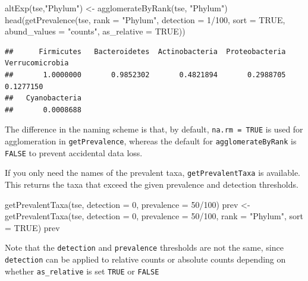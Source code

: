\documentclass[
]{book}
\newenvironment{Shaded}{\begin{snugshade}}{\end{snugshade}}
\newcommand{\AttributeTok}[1]{\textcolor[rgb]{0.77,0.63,0.00}{#1}}
\newcommand{\ConstantTok}[1]{\textcolor[rgb]{0.00,0.00,0.00}{#1}}
\newcommand{\DecValTok}[1]{\textcolor[rgb]{0.00,0.00,0.81}{#1}}
\newcommand{\FunctionTok}[1]{\textcolor[rgb]{0.00,0.00,0.00}{#1}}
\newcommand{\NormalTok}[1]{#1}
\newcommand{\OtherTok}[1]{\textcolor[rgb]{0.56,0.35,0.01}{#1}}
\newcommand{\SpecialCharTok}[1]{\textcolor[rgb]{0.00,0.00,0.00}{#1}}
\newcommand{\StringTok}[1]{\textcolor[rgb]{0.31,0.60,0.02}{#1}}
\begin{document}
\begin{Shaded}
\begin{Highlighting}[]
\FunctionTok{altExp}\NormalTok{(tse,}\StringTok{"Phylum"}\NormalTok{) }\OtherTok{\textless{}{-}} \FunctionTok{agglomerateByRank}\NormalTok{(tse, }\StringTok{"Phylum"}\NormalTok{)}
\FunctionTok{head}\NormalTok{(}\FunctionTok{getPrevalence}\NormalTok{(tse, }\AttributeTok{rank =} \StringTok{"Phylum"}\NormalTok{, }\AttributeTok{detection =} \DecValTok{1}\SpecialCharTok{/}\DecValTok{100}\NormalTok{, }\AttributeTok{sort =} \ConstantTok{TRUE}\NormalTok{,}
                   \AttributeTok{abund\_values =} \StringTok{"counts"}\NormalTok{, }\AttributeTok{as\_relative =} \ConstantTok{TRUE}\NormalTok{))}
\end{Highlighting}
\end{Shaded}

\begin{verbatim}
##      Firmicutes   Bacteroidetes  Actinobacteria  Proteobacteria Verrucomicrobia 
##       1.0000000       0.9852302       0.4821894       0.2988705       0.1277150 
##   Cyanobacteria 
##       0.0008688
\end{verbatim}

The difference in the naming scheme is that, by default, \texttt{na.rm\ =\ TRUE} is used
for agglomeration in \texttt{getPrevalence}, whereas the default for
\texttt{agglomerateByRank} is \texttt{FALSE} to prevent accidental data loss.

If you only need the names of the prevalent taxa, \texttt{getPrevalentTaxa} is
available. This returns the taxa that exceed the given prevalence and detection
thresholds.

\begin{Shaded}
\begin{Highlighting}[]
\FunctionTok{getPrevalentTaxa}\NormalTok{(tse, }\AttributeTok{detection =} \DecValTok{0}\NormalTok{, }\AttributeTok{prevalence =} \DecValTok{50}\SpecialCharTok{/}\DecValTok{100}\NormalTok{)}
\NormalTok{prev }\OtherTok{\textless{}{-}} \FunctionTok{getPrevalentTaxa}\NormalTok{(tse, }\AttributeTok{detection =} \DecValTok{0}\NormalTok{, }\AttributeTok{prevalence =} \DecValTok{50}\SpecialCharTok{/}\DecValTok{100}\NormalTok{,}
                         \AttributeTok{rank =} \StringTok{"Phylum"}\NormalTok{, }\AttributeTok{sort =} \ConstantTok{TRUE}\NormalTok{)}
\NormalTok{prev}
\end{Highlighting}
\end{Shaded}

Note that the \texttt{detection} and \texttt{prevalence} thresholds are not the same, since
\texttt{detection} can be applied to relative counts or absolute counts depending on
whether \texttt{as\_relative} is set \texttt{TRUE} or \texttt{FALSE}
\end{document}
